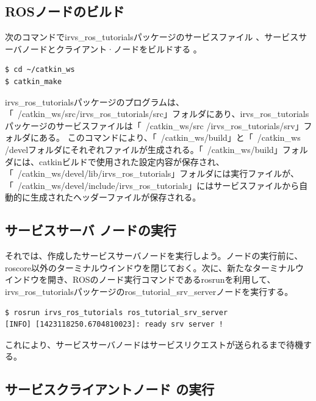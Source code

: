 \subsection{ROSノードのビルド}

次のコマンドでirvs\_ros\_tutorialsパッケージのサービスファイル 、サービスサーバノードとクライアント·ノードをビルドする  。

\begin{lstlisting}[language=ROS]
$ cd ~/catkin_ws
$ catkin_make
\end{lstlisting}

irvs\_ros\_tutorialsパッケージのプログラムは、「~/catkin\_ws/src/irvs\_ros\_tutorials/src」フォルダにあり、irvs\_ros\_tutorialsパッケージのサービスファイルは「~/catkin\_ws/src /irvs\_ros\_tutorials/srv」フォルダにある。
このコマンドにより、「~/catkin\_ws/build」と「~/catkin\_ws /develフォルダにそれぞれファイルが生成される。「~/catkin\_ws/build」フォルダには、catkinビルドで使用された設定内容が保存され、「~/catkin\_ws/devel/lib/irvs\_ros\_tutorials」フォルダには実行ファイルが、「~/catkin\_ws/devel/include/irvs\_ros\_tutorials」にはサービスファイルから自動的に生成されたヘッダーファイルが保存される。

\subsection{サービスサーバ  ノードの実行}

それでは、作成したサービスサーバノードを実行しよう。ノードの実行前に、roscore以外のターミナルウインドウを閉じておく。次に、新たなターミナルウインドウを開き、ROSのノード実行コマンドであるrosrunを利用して、irvs\_ros\_tutorialsパッケージのros\_tutorial\_srv\_serverノードを実行する。

\begin{lstlisting}[language=ROS]
$ rosrun irvs_ros_tutorials ros_tutorial_srv_server
[INFO] [1423118250.6704810023]: ready srv server !
\end{lstlisting}

これにより、サービスサーバノードはサービスリクエストが送られるまで待機する。

\subsection{サービスクライアントノード  の実行}

